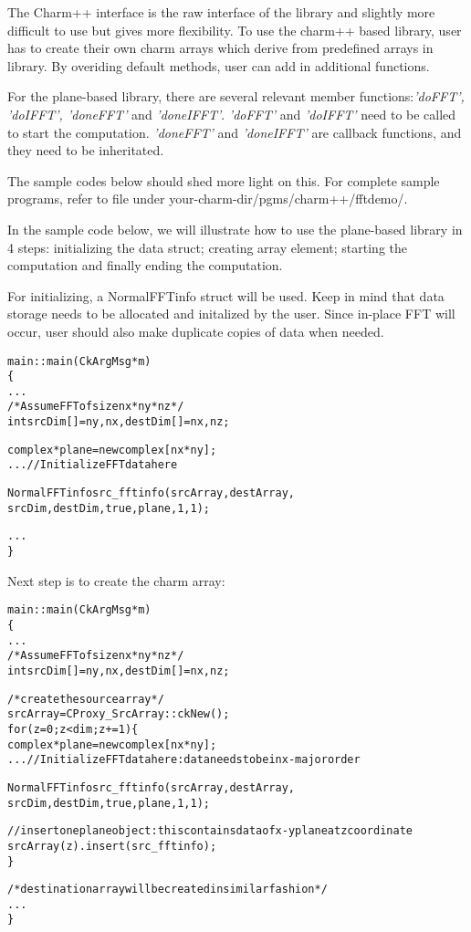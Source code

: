 The Charm++ interface is the raw interface of the library and slightly
more difficult to use but gives more flexibility. To use the charm++
based library, user has to create their own charm arrays which derive
from predefined arrays in library. By overiding default methods, user
can add in additional functions.


For the plane-based library, there are several relevant member
functions:{\it 'doFFT', 'doIFFT', 'doneFFT'} and {\it
'doneIFFT'}. {\it 'doFFT'} and {\it 'doIFFT'} need to be called to
start the computation. {\it 'doneFFT'} and {\it 'doneIFFT'} are
callback functions, and they need to be inheritated.

The sample codes below should shed more light on this. For complete
sample programs, refer to file under
your-charm-dir/pgms/charm++/fftdemo/.

In the sample code below, we will illustrate how to use the
plane-based library in 4 steps: initializing the data struct;
creating array element; starting the computation and finally ending
the computation.

For initializing, a NormalFFTinfo struct will be used. Keep in mind
that data storage needs to be allocated and initalized by the
user. Since in-place FFT will occur, user should also make duplicate
copies of data when needed.
\begin{alltt}
    main::main(CkArgMsg *m)
    \{
         ...
         /* Assume FFT of size  nx*ny*nz */
         int srcDim[] = {ny, nx}, destDim[] = {nx, nz};

         complex *plane =  new complex[nx*ny];
         ... // Initialize FFT data here 

         NormalFFTinfo src_fftinfo(srcArray, destArray, 
                                   srcDim, destDim, true, plane, 1, 1);

         ...
     \}
\end{alltt}

Next step is to create the charm array: 
\begin{alltt}
     main::main(CkArgMsg *m)
     \{
          ...
          /* Assume FFT of size  nx*ny*nz */
          int srcDim[] = {ny, nx}, destDim[] = {nx, nz};

          /* create the source array */
          srcArray = CProxy_SrcArray::ckNew();
          for (z = 0; z < dim; z+=1) \{
              complex *plane =  new complex[nx*ny];
              ... // Initialize FFT data here: data needs to be in x-major order 

              NormalFFTinfo src_fftinfo(srcArray, destArray, 
                                       srcDim, destDim, true, plane, 1, 1);

              // insert one plane object: this contains data of x-y plane at z coordinate	      
              srcArray(z).insert(src_fftinfo);  
           \}

          /* destination array will be created in similar fashion */
          ...
      \}
\end{alltt}

